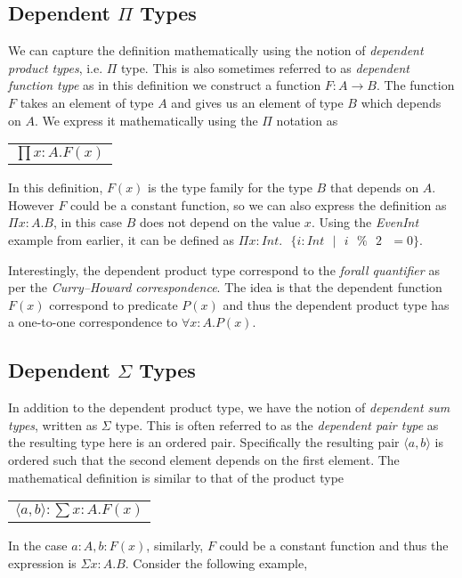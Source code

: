 \documentclass[a4paper,12pt]{report}
\begin{document}
\subsection{Dependent $\Pi$ Types}
We can capture the definition mathematically using the notion of \textit{dependent 
product types}, i.e. $\Pi$ type. This is also sometimes referred to as 
\textit{dependent function type} as in this definition we construct a function 
$F: A \rightarrow B$. The function $F$ takes an element of type $A$ and 
gives us an element of type $B$ which depends on $A$. We express it 
mathematically using the $\Pi$ notation as
\begin{center}
 \begin{tabular}{l}
   $\prod x: A.  F(x)$
 \end{tabular} 
\end{center}

In this definition, $F(x)$ is the type family for the type $B$ that depends on $A$.
However $F$ could be a constant function, so we can also express the definition 
as $\Pi x:A.B$, in this case $B$ does not depend 
on the value $x$. Using the \textit{EvenInt} example from earlier, 
it can be defined as 
$\Pi x:Int.\text{ }\{ i:Int\text{ }|\text{ }i\text{ }\%\text{ }2\text{ }= 0\}$.

\par
Interestingly, the dependent product type correspond to the 
\textit{forall quantifier} as per 
the \textit{Curry–Howard correspondence}. The idea is that the dependent 
function $F(x)$ correspond to predicate $P(x)$ and thus the dependent product 
type has a one-to-one correspondence to $\forall x: A. P(x)$.

\subsection{Dependent $\Sigma$ Types}
In addition to the dependent product type, we have the notion of \textit{dependent sum 
types}, written as $\Sigma$ type. This is often referred to as the 
\textit{dependent pair type} as the resulting type here is an ordered pair. 
Specifically the resulting pair $\langle a,b \rangle$ is ordered such that the 
second element depends on the first element. The 
mathematical definition is similar to that of the product type
\begin{center}
 \begin{tabular}{l}
   $\langle a,b \rangle :\sum x: A.  F(x)$
 \end{tabular} 
\end{center}
In the case $a:A, b: F(x)$, similarly, $F$ could be a constant function and thus 
the expression is $\Sigma x:A.B$. Consider the following example, 
\end{document}
